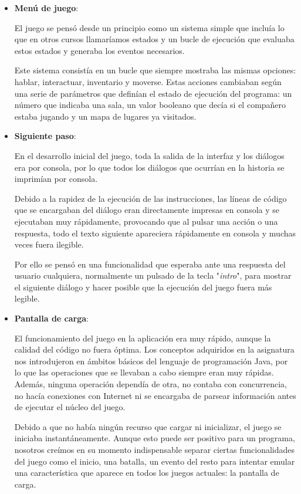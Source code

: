 \begin{itemize}
	\item \textbf{Menú de juego}:
	
	El juego se pensó desde un principio como un sistema simple que incluía lo que en otros cursos llamaríamos estados  y un bucle de ejecución que evaluaba estos estados y generaba los eventos necesarios.
	
	Este sistema consistía en un bucle que siempre mostraba las mismas opciones: hablar, interactuar, inventario y moverse. Estas acciones cambiaban según una serie de parámetros que definían el estado de ejecución del programa: un número que indicaba una sala, un valor booleano que decía si el compañero estaba jugando y un mapa de lugares ya visitados.
	
	\item \textbf{Siguiente paso}:
	
	En el desarrollo inicial del juego, toda la salida de la interfaz y los diálogos era por consola, por lo que todos los diálogos que ocurrían en la historia se imprimían por consola.
	
	Debido a la rapidez de la ejecución de las instrucciones, las líneas de código que se encargaban del diálogo eran directamente impresas en consola y se ejecutaban muy rápidamente, provocando que al pulsar una acción o una respuesta, todo el texto siguiente apareciera rápidamente en consola  y muchas veces fuera ilegible.
	
	Por ello se pensó en una funcionalidad que esperaba ante una respuesta del usuario cualquiera, normalmente un pulsado de la tecla "\textit{intro}", para mostrar el siguiente diálogo y hacer posible que la ejecución del juego fuera más legible.
	
	\item \textbf{Pantalla de carga}:
	
	El funcionamiento del juego en la aplicación era muy rápido, aunque la calidad del código no fuera óptima. Los conceptos adquiridos en la asignatura nos introdujeron en ámbitos básicos del lenguaje de programación Java, por lo que las operaciones que se llevaban a cabo siempre eran muy rápidas. Además, ninguna operación dependía de otra, no contaba con concurrencia, no hacía conexiones con Internet ni se encargaba de parsear  información antes de ejecutar el núcleo del juego.
	
	Debido a que no había ningún recurso que cargar ni inicializar, el juego se iniciaba instantáneamente.
	Aunque esto puede ser positivo para un programa, nosotros creímos en su momento indispensable separar ciertas funcionalidades del juego como el inicio, una batalla, un evento del resto para intentar emular una característica que aparece en todos los juegos actuales: la pantalla de carga.
	

\end{itemize}
